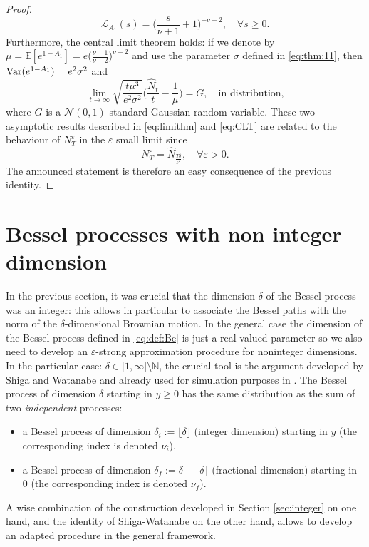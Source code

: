\documentclass[12pt]{article}
\numberwithin{equation}{section}
\begin{document}
\begin{proof}
\[
\mathcal{L}_{A_1}(s)=\Big(\frac{s}{\nu+1}+1\Big)^{-\nu-2},\quad \forall s\ge 0.
\]
Furthermore, the central limit theorem holds: if we denote by $\mu=\mathbb{E}[e^{1-A_1}]= e\Big(\frac{\nu+1}{\nu+2}\Big)^{\nu+2}$ and use the parameter $\sigma$ defined in \eqref{eq:thm:11}, then \({\rm Var}(e^{1-A_1})=e^2\sigma^2\) and 
\begin{equation}\label{eq:CLT}
\lim_{t\to\infty}\sqrt{\frac{t\mu^3}{e^2\sigma^2}}\Big(\frac{\hat{N}_t}{t}-\frac{1}{\mu}\Big)=G,\quad\mbox{in distribution,}
\end{equation}
where $G$ is a $\mathcal{N}(0,1)$ standard Gaussian random variable. These two asymptotic results described in \eqref{eq:limithm} and \eqref{eq:CLT} are related to the behaviour of $N_T^\varepsilon$ in the $\varepsilon$ small limit since   
\[
N_T^\varepsilon=\hat{N}_{\frac{T\delta}{\varepsilon^2}},\quad \forall \varepsilon>0.
\]
The announced statement is therefore an easy consequence of the previous identity.
\end{proof}
\section{Bessel processes with non integer dimension}\label{sec:noninteger}
In the previous section, it was crucial that the dimension $\delta$ of the Bessel process was an integer: this allows in particular to associate the Bessel paths with the norm of the $\delta$-dimensional Brownian motion. In the general case the dimension of the Bessel process defined in \eqref{eq:def:Be} is just a real valued parameter so we also need to develop an $\varepsilon$-strong approximation procedure for noninteger dimensions. In the particular case: $\delta\in[1,\infty[\setminus\mathbb{N}$, the crucial tool is the argument developed by Shiga and Watanabe \cite{Shiga} and already used for simulation purposes in \cite{Deaconu-Herrmann-2017}. The Bessel process of dimension $\delta$ starting in $y\ge 0$ has the same distribution as the sum of two \emph{independent} processes:
\begin{itemize}
\item a Bessel process of dimension $\delta_i:=\lfloor \delta \rfloor$ (integer dimension) starting in $y$ (the corresponding index is denoted $\nu_i$),
\item a Bessel process of dimension $\delta_f:=\delta-\lfloor \delta \rfloor$ (fractional dimension) starting in $0$ (the corresponding index is denoted $\nu_f$).
\end{itemize}
A wise combination of the construction developed in Section \ref{sec:integer} on one hand, and the identity of Shiga-Watanabe on the other hand, allows to develop an adapted procedure in the general framework. 
\end{document}
